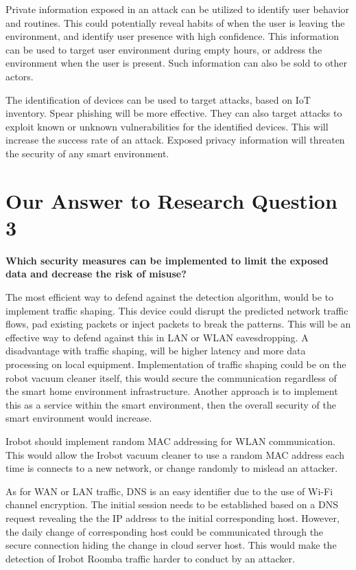 Private information exposed in an attack can be utilized to identify user behavior and routines. This could potentially reveal habits of when the user is leaving the environment, and identify user presence with high confidence. This information can be used to target user environment during empty hours, or address the environment when the user is present. Such information can also be sold to other actors. 

The identification of devices can be used  to target attacks, based on IoT inventory. Spear phishing \cite{spear_phishing} will be more effective. They can also target attacks to exploit known or unknown vulnerabilities for the identified devices. This will increase the success rate of an attack. Exposed privacy information will threaten the security of any smart environment. 

\section{Our Answer to Research Question  3}
\textbf{Which security measures can be implemented to limit the exposed data and decrease the risk of misuse?} 

The most efficient way to defend against the detection algorithm, would be to implement traffic shaping. This device could disrupt the predicted network traffic flows, pad existing packets or inject packets to break the patterns. This will be an effective way to defend against this in LAN or WLAN eavesdropping. A disadvantage with traffic shaping, will be higher latency and more data processing on local equipment. Implementation of traffic shaping could be on the robot vacuum cleaner itself, this would secure the communication regardless of the smart home environment infrastructure. Another approach is to implement this as a service within the smart environment, then the overall security of the smart environment would increase. 

Irobot should implement random MAC addressing \cite{random_mac_bernardos2020rfc} for WLAN communication. This would allow the Irobot vacuum cleaner to use a random MAC address each time is connects to a new network, or change randomly to mislead an attacker. 

As for WAN or LAN traffic, DNS is an easy identifier due to the use of Wi-Fi channel encryption. The initial session needs to be established based on a DNS request revealing the the IP address to the initial corresponding host. However, the daily change of corresponding host could be communicated through the secure connection hiding the change in cloud server host. This would make the detection of Irobot Roomba traffic harder to conduct by an attacker.

